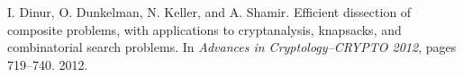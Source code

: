\documentclass[letterpaper,12pt]{article}
\begin{document}
\begin{thebibliography}{1}
 I. Dinur, O. Dunkelman, N. Keller, and A. Shamir. Efficient dissection of composite problems, with applications to cryptanalysis, knapsacks, and combinatorial search problems. In
\textit{Advances in Cryptology--CRYPTO 2012}, pages 719--740. 2012.
  
\end{thebibliography}
\end{document}
